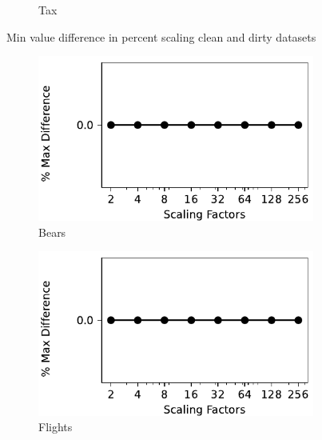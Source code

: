 \begin{figure}[!ht]
\begin{subfigure}{0.32\textwidth}
    \caption{Tax}
    \label{exp:min_tax}
\end{subfigure}
\hfill
\caption{Min value difference in percent scaling clean and dirty datasets}
\label{exp:min_difference_datasets}
\end{figure}

\begin{figure}[!ht]
    \centering 
    \centering
\begin{subfigure}{0.32\textwidth}
    \includegraphics[width=\textwidth]{figures/plot/max/max_diff_beers.pdf}
    \caption{Bears}
    \label{exp:max_bears}
\end{subfigure}
\hfill
\begin{subfigure}{0.32\textwidth}
    \includegraphics[width=\textwidth]{figures/plot/max/max_diff_flights.pdf}
    \caption{Flights}
    \label{exp:max_flights}
\end{subfigure}
\hfill
\begin{subfigure}{0.32\textwidth}

\end{subfigure}
\end{figure}
